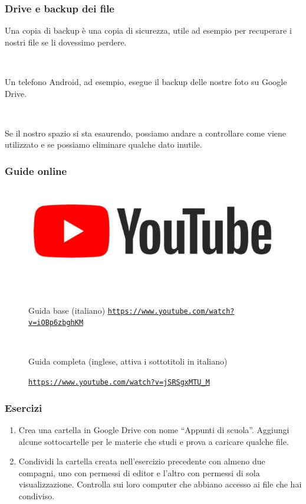 \documentclass[handout]{beamer}
\begin{document}
\begin{frame}
\frametitle{Drive e backup dei file}
Una \alert{copia di backup} è una copia di sicurezza, utile ad esempio per recuperare i nostri file se li dovessimo perdere.\pause

~

Un telefono Android, ad esempio, esegue il backup delle nostre foto su Google Drive.\pause

~

Se il nostro spazio si sta esaurendo, possiamo andare a controllare come viene utilizzato e se possiamo eliminare qualche dato inutile.
\end{frame}



\begin{frame}
\frametitle{Guide online}
\begin{figure}
\includegraphics[width=.5\columnwidth]{img/ytlogo.jpg}

~

Guida base (italiano)
\href{https://www.youtube.com/watch?v=iOBp6zbghKM}{\texttt{https://www.youtube.com/watch?v=iOBp6zbghKM}}

~

Guida completa (inglese, attiva i sottotitoli in italiano)

\href{https://www.youtube.com/watch?v=jSRSgxMTU_M}{\texttt{https://www.youtube.com/watch?v=jSRSgxMTU\_M}}
\end{figure}
\end{frame}



\begin{frame}
\frametitle{Esercizi}
\begin{enumerate}
  \item Crea una cartella in Google Drive con nome ``Appunti di scuola''. Aggiungi alcune sottocartelle per le materie che studi e prova a caricare qualche file.
  \item Condividi la cartella creata nell'esercizio precedente con almeno due compagni, uno con permessi di editor e l'altro con permessi di sola visualizzazione. Controlla sui loro computer che abbiano accesso ai file che hai condiviso.
\end{enumerate}
\end{frame}
\end{document}
